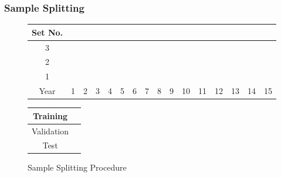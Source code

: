 \documentclass[]{beamer}
\begin{document}
\begin{frame}
\frametitle{Sample Splitting}
\begin{figure}
	\begin{center}
		\begin{tabular}{|c|p{0.25cm}p{0.25cm}p{0.25cm}p{0.25cm}p{0.25cm}p{0.25cm}p{0.25cm}p{0.25cm}p{0.25cm}p{0.25cm}p{0.25cm}p{0.25cm}|p{0.25cm}p{0.25cm}p{0.25cm}|}
			\hline
			Set No. &&&&&&&&&&&&&&& \\
			\hline
			3 & \cellcolor{cyan} & \cellcolor{cyan} & \cellcolor{cyan} & \cellcolor{cyan} & \cellcolor{cyan} & \cellcolor{cyan} & \cellcolor{cyan} & \cellcolor{cyan} & \cellcolor{cyan} & \cellcolor{cyan} & \cellcolor{cyan} &
			\cellcolor{pink} & 
			\cellcolor{olive} & \cellcolor{olive} &	\cellcolor{olive} \\
			2 & \cellcolor{cyan} & \cellcolor{cyan} & \cellcolor{cyan} & \cellcolor{cyan} & \cellcolor{cyan} & \cellcolor{cyan} & \cellcolor{cyan} & \cellcolor{cyan} & \cellcolor{cyan} & \cellcolor{cyan} &
			\cellcolor{pink} & 
			\cellcolor{olive} & \cellcolor{olive} &	\cellcolor{olive} & \cellcolor{olive} \\
			1 & \cellcolor{cyan} & \cellcolor{cyan} & \cellcolor{cyan} & \cellcolor{cyan} & \cellcolor{cyan} & \cellcolor{cyan} & \cellcolor{cyan} & \cellcolor{cyan} & \cellcolor{cyan} &
			\cellcolor{pink} & 
			\cellcolor{olive} & \cellcolor{olive} &	\cellcolor{olive} & \cellcolor{olive} & \cellcolor{olive} \\
			\hline
			Year & 1 & 2 & 3 & 4 & 5 & 6 & 7 & 8 & 9 & 10 & 11 & 12 & 13 & 14 & 15\\
			\hline
		\end{tabular}
		\medskip
		\begin{tabular}{|c|p{0.25cm}|}
			\hline
			Training & \cellcolor{cyan} \\
			\hline
			Validation & \cellcolor{pink} \\
			\hline
			Test & \cellcolor{olive} \\
			\hline
		\end{tabular}
	\end{center}
	\caption{Sample Splitting Procedure}
\end{figure}
\end{frame}

\end{document}
